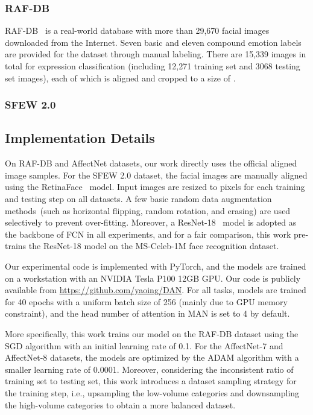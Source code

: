 \documentclass{article}
\begin{document}
\subsubsection{RAF-DB} 
RAF-DB~\cite{li2018reliable} is a real-world database with more than 29,670 facial images downloaded from the Internet. Seven basic and eleven compound emotion labels are provided for the dataset through manual labeling. There are 15,339  images in total for expression classification (including 12,271 training set and 3068 testing set images), each of which is aligned and cropped to a size of . 

\subsubsection{SFEW 2.0} 

\subsection{Implementation Details}
On RAF-DB and AffectNet datasets, our work directly uses the official aligned image samples. For the SFEW 2.0 dataset, the facial images are manually aligned using the RetinaFace~\cite{deng2019retinaface} model. Input images are resized to  pixels for each training and testing step on all datasets. A few basic random data augmentation methods~(such as horizontal flipping, random rotation, and erasing) are used selectively to prevent over-fitting. Moreover, a ResNet-18~\cite{he2016deep} model is adopted as the backbone of FCN in all experiments, and for a fair comparison, this work pre-trains the ResNet-18 model on the MS-Celeb-1M face recognition dataset. 

Our experimental code is implemented with PyTorch, and the models are trained on a workstation with an NVIDIA Tesla P100 12GB GPU. {Our code is publicly available from} \url{https://github.com/yaoing/DAN}. For all tasks, models are trained for 40 epochs with {a uniform batch size of 256 (mainly due to GPU memory constraint)}, and the head number of attention in MAN is set to 4 by default.

More specifically, this work trains our model on the RAF-DB dataset using the SGD algorithm with an initial learning rate of 0.1. For the AffectNet-7 and AffectNet-8 datasets, the models are optimized by the ADAM algorithm with a smaller learning rate of 0.0001. Moreover, considering the inconsistent ratio of training set to testing set, this work introduces a dataset sampling strategy for the training step, i.e., upsampling the low-volume categories and downsampling the high-volume categories to obtain a more balanced dataset. 
\end{document}
